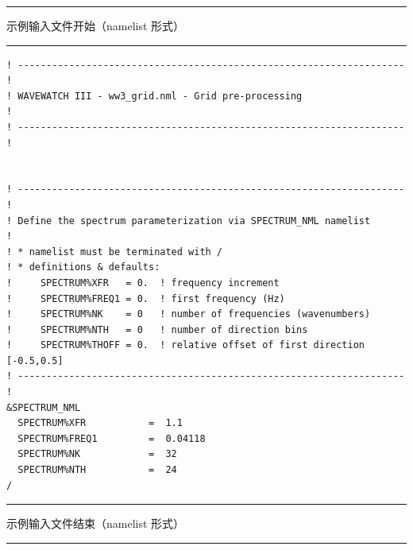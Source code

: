 \vspace{\baselineskip} \noindent
\rule[1mm]{43mm}{.5mm} {\rm 示例输入文件开始（namelist 形式）}
\rule[1mm]{43mm}{.5mm}
\begin{footnotesize}
\begin{verbatim}
! -------------------------------------------------------------------- !
! WAVEWATCH III - ww3_grid.nml - Grid pre-processing                   !
! -------------------------------------------------------------------- !


! -------------------------------------------------------------------- !
! Define the spectrum parameterization via SPECTRUM_NML namelist
!
! * namelist must be terminated with /
! * definitions & defaults:
!     SPECTRUM%XFR   = 0.  ! frequency increment
!     SPECTRUM%FREQ1 = 0.  ! first frequency (Hz)
!     SPECTRUM%NK    = 0   ! number of frequencies (wavenumbers)
!     SPECTRUM%NTH   = 0   ! number of direction bins
!     SPECTRUM%THOFF = 0.  ! relative offset of first direction [-0.5,0.5]
! -------------------------------------------------------------------- !
&SPECTRUM_NML
  SPECTRUM%XFR           =  1.1
  SPECTRUM%FREQ1         =  0.04118
  SPECTRUM%NK            =  32
  SPECTRUM%NTH           =  24
/
\end{verbatim}
\end{footnotesize}
\rule[1mm]{46mm}{.5mm} 示例输入文件结束（namelist 形式）
\rule[1mm]{45.1mm}{.5mm}



\pb
